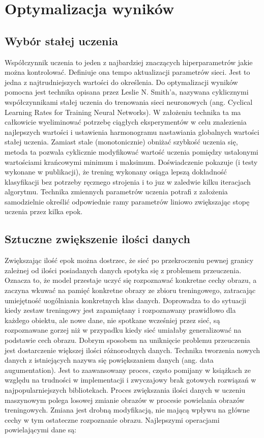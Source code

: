 \documentclass[12pt,a4paper,twoside,titlepage,openright]{book}
\begin{document}
\section{Optymalizacja wyników}
\subsection{Wybór stałej uczenia}
Współczynnik uczenia to jeden z najbardziej znaczących hiperparametrów jakie można kontrolować. Definiuje ona tempo aktualizacji parametrów sieci. Jest to jedna z najtrudniejszych wartości do określenia. Do optymalizacji wyników pomocna jest technika opisana przez Leslie N. Smith’a, nazywana cyklicznymi współczynnikami stałej uczenia do trenowania sieci neuronowych (ang. Cyclical Learning Rates for Training Neural Networks). W założeniu technika ta ma całkowicie wyeliminować potrzebę ciągłych eksperymentów w celu znalezienia najlepszych wartości i ustawienia harmonogramu nastawiania globalnych wartości stałej uczenia. Zamiast stale (monotonicznie) obniżać szybkość uczenia się, metoda ta pozwala cyklicznie modyfikować wartość uczenia pomiędzy ustalonymi wartościami krańcowymi minimum i maksimum. Doświadczenie pokazuje (i testy wykonane w publikacji), że trening wykonany osiąga lepszą dokładność klasyfikacji bez potrzeby ręcznego strojenia i to juz w zaledwie kilku iteracjach algorytmu. Technika zmiennych parametrów uczenia potrafi z założenia samodzielnie określić odpowiednie ramy parametrów liniowo zwiększając stopę uczenia przez kilka epok. \cite{DBLP:journals/corr/Smith15a}

\subsection{Sztuczne zwiększenie ilości danych}
Zwiększając ilość epok można dostrzec, że sieć po przekroczeniu pewnej granicy zależnej od ilości posiadanych danych spotyka się z problemem przeuczenia. Oznacza to, że model przestaje uczyć się rozpoznawać konkretne cechy obrazu, a zaczyna wkuwać na pamięć konkretne obrazy ze zbioru treningowego, zatracając umiejętność uogólniania konkretnych klas danych. Doprowadza to do sytuacji kiedy zestaw treningowy jest zapamiętany i rozpoznawany prawidłowo dla każdego obiektu, ale nowe dane, nie spotkane wcześniej przez sieć, są rozpoznawane gorzej niż w przypadku kiedy sieć umiałaby generalizować na podstawie cech obrazu.
Dobrym sposobem na uniknięcie problemu przeuczenia jest dostarczenie większej ilości różnorodnych danych. Technika tworzenia nowych danych z istniejących nazywa się powiększaniem danych (ang. data augumentation). Jest to zaawansowany proces, często pomijany w książkach ze względu na trudności w implementacji i zwyczajowy brak gotowych rozwiązań w najpopularniejszych bibliotekach. 
Proces zwiększania ilości danych w uczeniu maszynowym polega losowej zmianie obrazów w procesie powielania obrazów treningowych. Zmiana jest drobną modyfikacją, nie mającą wpływu na główne cechy w tym ostateczne rozpoznanie obrazu. Najlepszymi operacjami powielającymi dane są:
\end{document}
